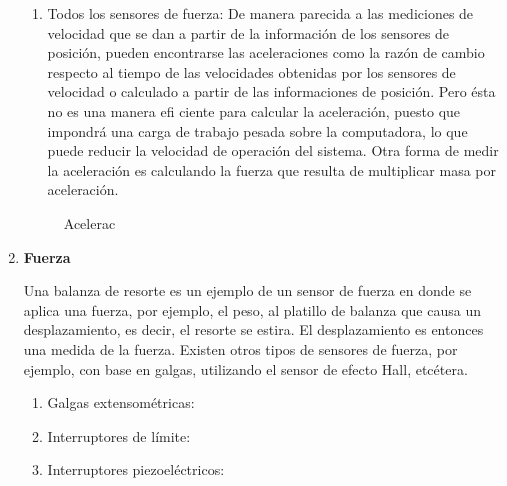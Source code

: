 \begin{enumerate}
			\begin{enumerate}
				\item Todos los sensores de fuerza: De manera parecida a las mediciones de velocidad que se dan a partir de la información de los sensores de posición, pueden encontrarse las aceleraciones como la razón de cambio respecto al tiempo de las velocidades obtenidas por los sensores de velocidad o calculado a partir de las informaciones de posición. Pero ésta no es una manera efi ciente para calcular la aceleración, puesto que impondrá una carga de trabajo pesada sobre la computadora, lo que puede reducir la velocidad de operación del sistema. Otra forma de medir la aceleración es calculando la fuerza que resulta de multiplicar masa por aceleración. \cite{saha2010robotics}\\
			\end{enumerate}
				\begin{figure}[h]Acelerac
				\centering
				\hfill
			\end{figure}
			
			\item \textbf{Fuerza}
			
			Una balanza de resorte es un ejemplo de un sensor de
			fuerza en donde se aplica una fuerza, por ejemplo, el peso, al platillo de balanza que causa un desplazamiento, es decir, el resorte se estira. El desplazamiento es entonces una medida de la fuerza. Existen otros tipos de sensores de fuerza, por ejemplo, con base en galgas, utilizando el sensor de efecto Hall, etcétera. \cite{saha2010robotics}\\
			\begin{enumerate}
				\item Galgas extensométricas:
				
				\item Interruptores de límite:
				
				\item Interruptores piezoeléctricos:
				
			\end{enumerate}
		\end{enumerate}
		
